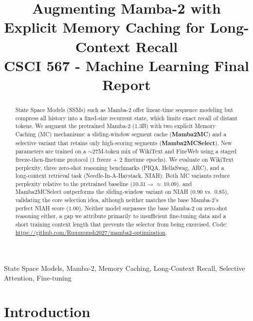 \documentclass[conference]{IEEEtran}
\begin{document}
\title{Augmenting Mamba-2 with Explicit Memory Caching for Long-Context Recall\\
{\footnotesize CSCI 567 - Machine Learning Final Report}
}

\author{
}

\maketitle

\begin{abstract}
State Space Models (SSMs) such as Mamba-2 offer linear-time sequence modeling but compress all history into a fixed-size recurrent state, which limits exact recall of distant tokens. We augment the pretrained Mamba-2 (1.3B) with two explicit Memory Caching (MC) mechanisms: a sliding-window segment cache (\textbf{Mamba2MC}) and a selective variant that retains only high-scoring segments (\textbf{Mamba2MCSelect}). New parameters are trained on a $\sim$27M-token mix of WikiText and FineWeb using a staged freeze-then-finetune protocol (1 freeze + 2 finetune epochs). We evaluate on WikiText perplexity, three zero-shot reasoning benchmarks (PIQA, HellaSwag, ARC), and a long-context retrieval task (Needle-In-A-Haystack, NIAH). Both MC variants reduce perplexity relative to the pretrained baseline ($10.31 \!\to\! {\approx}\,10.09$), and Mamba2MCSelect outperforms the sliding-window variant on NIAH ($0.90$ vs.\ $0.85$), validating the core selection idea, although neither matches the base Mamba-2's perfect NIAH score ($1.00$). Neither model surpasses the base Mamba-2 on zero-shot reasoning either, a gap we attribute primarily to insufficient fine-tuning data and a short training context length that prevents the selector from being exercised. Code: \url{https://github.com/Ruuuuuush2027/mamba2-optimization}.
\end{abstract}

\begin{IEEEkeywords}
State Space Models, Mamba-2, Memory Caching, Long-Context Recall, Selective Attention, Fine-tuning
\end{IEEEkeywords}

\section{Introduction}
\end{document}
